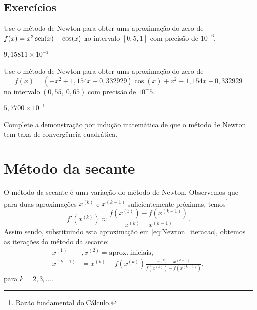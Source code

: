 \subsection*{Exercícios}

\begin{exer}\label{exer:Newton_1}
  Use o método de Newton para obter uma aproximação do zero de $f(x)=x^3\operatorname{sen}(x)-\cos(x)$ no intervalo $[0,5, 1]$ com precisão de $10^{-6}$.
\end{exer}
\begin{resp}
  $9,15811\times 10^{-1}$
\end{resp}

\begin{exer}\label{exer:Newton_multpar}
  Use o método de Newton para obter uma aproximação do zero de
  \begin{equation}
    f(x) = (-x^2+1,154x-0,332929)\cos(x) + x^2 - 1,154x + 0,332929
  \end{equation}
no intervalo $(0,55, ~0,65)$ com precisão de $10^-5$.
\end{exer}
\begin{resp}
  $5,7700\times 10^{-1}$
\end{resp}

\begin{exer}\label{ex:Newton_analise_conv}
  Complete a demonstração por indução matemática de que o método de Newton tem taxa de convergência quadrática.
\end{exer}

\section{Método da secante}\label{cap_eq1d_sec_secante}

O método da secante é uma variação do método de Newton. Observemos que para duas aproximações $x^{(k)}$ e $x^{(k-1)}$ suficientemente próximas, temos\footnote{Razão fundamental do Cálculo.}
\begin{equation}
  f'(x^{(k)}) \approx \frac{f(x^{(k)})-f(x^{(k-1)})}{x^{(k)}-x^{(k-1)}}.
\end{equation}
Assim sendo, substituindo esta aproximação em \eqref{eq:Newton_iteracao}, obtemos as iterações do método da secante:
\begin{align}
  x^{(1)}&, x^{(2)} = \text{aprox. iniciais},\\
  x^{(k+1)} &= x^{(k)} - f(x^{(k)})\frac{x^{(k)}-x^{(k-1)}}{f(x^{(k)})-f(x^{(k-1)})},
\end{align}
para $k=2,3,\ldots$.

